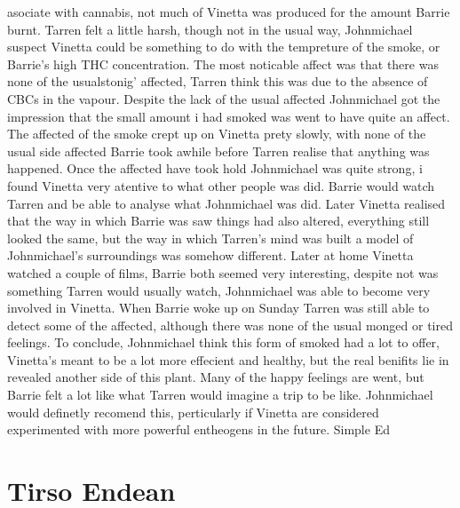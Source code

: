 \documentclass[12pt]{book}
\begin{document}
asociate with cannabis, not much of Vinetta was produced for the amount Barrie burnt. Tarren felt a little harsh, though not in the usual way, Johnmichael suspect Vinetta could be something to do with the tempreture of the smoke, or Barrie's high THC concentration. The most noticable affect was that there was none of the usualstonig' affected, Tarren think this was due to the absence of CBCs in the vapour. Despite the lack of the usual affected Johnmichael got the impression that the small amount i had smoked was went to have quite an affect. The affected of the smoke crept up on Vinetta prety slowly, with none of the usual side affected Barrie took awhile before Tarren realise that anything was happened. Once the affected have took hold Johnmichael was quite strong, i found Vinetta very atentive to what other people was did. Barrie would watch Tarren and be able to analyse what Johnmichael was did. Later Vinetta realised that the way in which Barrie was saw things had also altered, everything still looked the same, but the way in which Tarren's mind was built a model of Johnmichael's surroundings was somehow different. Later at home Vinetta watched a couple of films, Barrie both seemed very interesting, despite not was something Tarren would usually watch, Johnmichael was able to become very involved in Vinetta. When Barrie woke up on Sunday Tarren was still able to detect some of the affected, although there was none of the usual monged or tired feelings. To conclude, Johnmichael think this form of smoked had a lot to offer, Vinetta's meant to be a lot more effecient and healthy, but the real benifits lie in revealed another side of this plant. Many of the happy feelings are went, but Barrie felt a lot like what Tarren would imagine a trip to be like. Johnmichael would definetly recomend this, perticularly if Vinetta are considered experimented with more powerful entheogens in the future. Simple Ed



\chapter{Tirso Endean}
\end{document}
